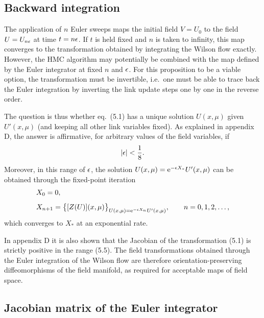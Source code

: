 \subsection{Backward integration}

The application of $n$ Euler sweeps
maps the initial field
$V=U_0$ to the field $U=U_{n\epsilon}$ at time $t=n\epsilon$. If $t$ is held
fixed and $n$ is taken to infinity, this map converges to the
transformation obtained by integrating the Wilson flow exactly.
However, the HMC algorithm may potentially be combined
with the map defined by the Euler integrator at fixed $n$ and $\epsilon$.
For this proposition to be a viable option,
the transformation must be invertible, i.e.\ one must
be able to trace back the Euler integration
by inverting the link
update steps one by one in the reverse order.

The question is thus whether
eq.~(5.1) has a unique solution $U(x,\mu)$ given $U'(x,\mu)$
(and keeping all other link variables fixed).
As explained in appendix D,
the answer is affirmative,
for arbitrary values of the field variables, if
\begin{equation}
  |\epsilon|<\frac{1}{8}.
\end{equation}
Moreover, in this range of $\epsilon$,
the solution $U(x,\mu)=\mathrm{e}^{-\epsilon X_{*}}U'(x,\mu)$
can be obtained through the fixed-point iteration
\begin{align}
  &X_0=0,
  \\[1.0ex]
  &X_{n+1}=\bigl\{[Z(U)](x,\mu)\bigr\}_{
  U(x,\mu)=\mathrm{e}^{-\epsilon X_n}U'(x,\mu)},
  \qquad
  n=0,1,2,\ldots,
\end{align}
which converges to $X_{*}$ at an exponential rate.

In appendix D it is also shown that the
Jacobian of the transformation (5.1)
is strictly positive in the range (5.5).
The field transformations obtained through the Euler
integration of the Wilson flow are therefore orientation-preserving
diffeomorphisms of the field manifold, as required
for acceptable maps of field space.


\subsection{Jacobian matrix of the Euler integrator}

